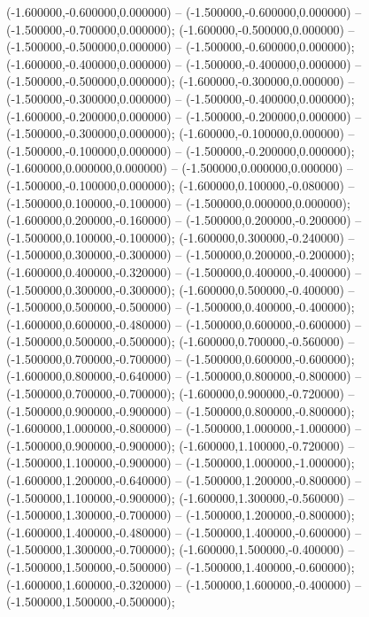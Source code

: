  (-1.600000,-0.600000,0.000000) -- (-1.500000,-0.600000,0.000000) -- (-1.500000,-0.700000,0.000000);
 (-1.600000,-0.500000,0.000000) -- (-1.500000,-0.500000,0.000000) -- (-1.500000,-0.600000,0.000000);
 (-1.600000,-0.400000,0.000000) -- (-1.500000,-0.400000,0.000000) -- (-1.500000,-0.500000,0.000000);
 (-1.600000,-0.300000,0.000000) -- (-1.500000,-0.300000,0.000000) -- (-1.500000,-0.400000,0.000000);
 (-1.600000,-0.200000,0.000000) -- (-1.500000,-0.200000,0.000000) -- (-1.500000,-0.300000,0.000000);
 (-1.600000,-0.100000,0.000000) -- (-1.500000,-0.100000,0.000000) -- (-1.500000,-0.200000,0.000000);
 (-1.600000,0.000000,0.000000) -- (-1.500000,0.000000,0.000000) -- (-1.500000,-0.100000,0.000000);
 (-1.600000,0.100000,-0.080000) -- (-1.500000,0.100000,-0.100000) -- (-1.500000,0.000000,0.000000);
 (-1.600000,0.200000,-0.160000) -- (-1.500000,0.200000,-0.200000) -- (-1.500000,0.100000,-0.100000);
 (-1.600000,0.300000,-0.240000) -- (-1.500000,0.300000,-0.300000) -- (-1.500000,0.200000,-0.200000);
 (-1.600000,0.400000,-0.320000) -- (-1.500000,0.400000,-0.400000) -- (-1.500000,0.300000,-0.300000);
 (-1.600000,0.500000,-0.400000) -- (-1.500000,0.500000,-0.500000) -- (-1.500000,0.400000,-0.400000);
 (-1.600000,0.600000,-0.480000) -- (-1.500000,0.600000,-0.600000) -- (-1.500000,0.500000,-0.500000);
 (-1.600000,0.700000,-0.560000) -- (-1.500000,0.700000,-0.700000) -- (-1.500000,0.600000,-0.600000);
 (-1.600000,0.800000,-0.640000) -- (-1.500000,0.800000,-0.800000) -- (-1.500000,0.700000,-0.700000);
 (-1.600000,0.900000,-0.720000) -- (-1.500000,0.900000,-0.900000) -- (-1.500000,0.800000,-0.800000);
 (-1.600000,1.000000,-0.800000) -- (-1.500000,1.000000,-1.000000) -- (-1.500000,0.900000,-0.900000);
 (-1.600000,1.100000,-0.720000) -- (-1.500000,1.100000,-0.900000) -- (-1.500000,1.000000,-1.000000);
 (-1.600000,1.200000,-0.640000) -- (-1.500000,1.200000,-0.800000) -- (-1.500000,1.100000,-0.900000);
 (-1.600000,1.300000,-0.560000) -- (-1.500000,1.300000,-0.700000) -- (-1.500000,1.200000,-0.800000);
 (-1.600000,1.400000,-0.480000) -- (-1.500000,1.400000,-0.600000) -- (-1.500000,1.300000,-0.700000);
 (-1.600000,1.500000,-0.400000) -- (-1.500000,1.500000,-0.500000) -- (-1.500000,1.400000,-0.600000);
 (-1.600000,1.600000,-0.320000) -- (-1.500000,1.600000,-0.400000) -- (-1.500000,1.500000,-0.500000);
